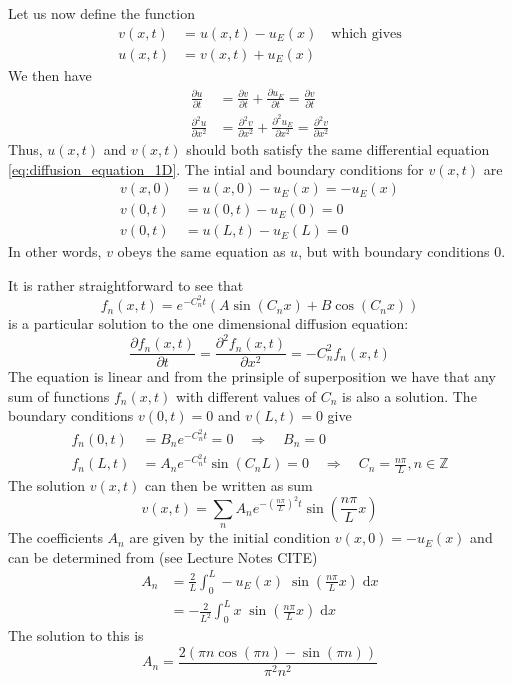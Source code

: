 \documentclass[reprint, english,notitlepage,nofootinbib]{revtex4-1}  %
\newcommand{\ddpart}[2]{\frac{\partial #1}{\partial #2}}
\newcommand{\ddpartsq}[2]{\frac{\partial^2 #1}{\partial #2^2}}
\begin{document}
Let us now define the function
\begin{align*}
v(x, t) &= u(x, t) - u_E(x) \quad \text{which gives} \\
u(x, t) &= v(x, t) + u_E(x)
\end{align*}
We then have
\begin{align*}
\ddpart{u}{t} &= \ddpart{v}{t} + \ddpart{u_E}{t} = \ddpart{v}{t} \\
\ddpartsq{u}{x} &= \ddpartsq{v}{x} + \ddpartsq{u_E}{x} = \ddpartsq{v}{x}
\end{align*}
Thus, $u(x, t)$ and $v(x, t)$ should both satisfy the same differential equation \eqref{eq:diffusion_equation_1D}. The intial and boundary conditions for $v(x, t)$ are
\begin{align*}
v(x, 0) &= u(x, 0) - u_E(x) = - u_E(x) \\
v(0, t) &= u(0, t) - u_E(0) = 0 \\
v(0, t) &= u(L, t) - u_E(L) = 0
\end{align*}
In other words, $v$ obeys the same equation as $u$, but with boundary conditions 0.

It is rather straightforward to see that
\begin{equation}
\label{eq:analytic_part_sol_1D_diffusion_general}
f_n(x, t) = e^{- C_n^2 t} \left( A \sin(C_n x) + B \cos(C_n x) \right)
\end{equation}
is a particular solution to the one dimensional diffusion equation:
\begin{equation*}
\frac{\partial f_n(x, t)}{\partial t} = \frac{\partial^2 f_n(x, t)}{\partial x^2} = -C_n^2 f_n(x, t)
\end{equation*}
The equation is linear and from the prinsiple of superposition we have that any sum of functions $f_n(x, t)$ with different values of $C_n$ is also a solution. The boundary conditions $v(0, t) = 0$ and $v(L, t) = 0$ give
\begin{align*}
f_n(0, t) &= B_n e^{- C_n^2 t} = 0 \quad \Rightarrow \quad B_n = 0 \\
f_n(L, t) &= A_n e^{- C_n^2 t} \sin(C_n L) = 0 \quad \Rightarrow \quad C_n = \frac{n \pi}{L}, n \in \mathbb{Z}
\end{align*}
The solution $v(x, t)$ can then be written as sum
\begin{equation*}
v(x, t) = \sum_n A_n e^{- \left( \frac{n \pi}{L} \right)^2 t} \sin( \frac{n \pi}{L} x)
\end{equation*}
The coefficients $A_n$ are given by the initial condition $v(x, 0) = - u_E(x)$ and can be determined from (see Lecture Notes CITE)
\begin{align*}
A_n &= \frac{2}{L} \int_0^L - u_E(x) \; \sin( \frac{n \pi}{L} x) \; \mathrm dx \\
&= - \frac{2}{L^2} \int_0^L x \; \sin( \frac{n \pi}{L} x) \; \mathrm dx
\end{align*}
The solution to this is
\begin{equation}
\label{eq:fourier_coeffs}
A_n = \dfrac{2 \left( \pi n \cos(\pi n) - \sin(\pi n) \right)}{\pi^2 n^2}
\end{equation}
\end{document}
